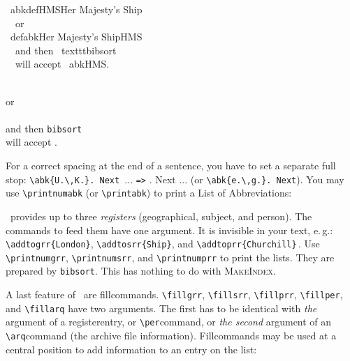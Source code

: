 \documentclass[12pt,a4paper]{article}
\newcommand{\pbs}{\string\ \unskip}
\newcommand{\bs}{\protect\pbs}
\renewcommand{\{}{{\normalfont\lbashortmem}}
\renewcommand{\}}{{\normalfont\rbashortmem}}
\begin{document}
 \vspace{-.25ex}
 \Doppelbox
 {
      \bs abkdef\{HMS\}\{Her Majesty\string's Ship\}
   \\[.35ex] \ \ or
   \\[.35ex] \bs defabk\{Her Majesty\string's Ship\}\{HMS\}
   \\[.35ex] \ \ and then \bs texttt\{bibsort\}
   \\[.35ex] \ \ will accept \bs abk\{HMS\}.
   \vspace{-1ex}\strut
 }
 {
   \\  or
   \\ 
   \\  and then \texttt{bibsort}
   \\  will accept .
   \vspace{-1ex}\strut
 }

\noindent 
For a correct spacing at the end of a sentence, you have to set 
a separate full stop: \verb|\abk{U.\,K.}. Next |... \verb|=>| . Next
... (or \verb|\abk{e.\,g.}. Next|).
You may use \verb|\printnumabk| (or \verb|\printabk|) to print a 
List of Abbreviations:

\vspace{-.325ex}
\printnumabklist

\noindent 
\BibArts\ provides up to three \textit{registers} (geographical, subject, and person). 
The commands to feed them have one argument. It is
invisible in your text, e.\,g.: \verb|\addtogrr{London}|,
\verb|\addtosrr{Ship}|, and \verb|\addtoprr{Churchill}|\,.
Use \verb|\printnumgrr|, \verb|\printnumsrr|, and \verb|\printnumprr| 
to print the lists. They are prepared by \texttt{bibsort}. This
has nothing to do with \textsc{MakeIndex}.

\vspace{1ex}\noindent 
A last feature of \BibArts\ are fill\hy commands. \verb|\fillgrr|, 
\verb|\fillsrr|, \verb|\fillprr|, \verb|\fillper|, and \verb|\fillarq| 
have two arguments. The first has to be identical with \textit{the} argument 
of a register\hy entry, or \verb|\per|\hy command, or \textit{the second} 
argument of an \verb|\arq|\hy command (the archive file information). 
Fill\hy commands may be used at a central position to add information to 
an entry on the list:
\end{document}
